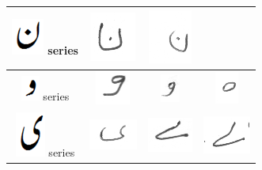 \begin{table}[h]
\begin{tabular}{@{}cccc@{}}
\hline
\includegraphics[scale=0.15]{noon_orig} series & \includegraphics[scale=0.15]{143} & \includegraphics[scale=0.15]{144} &  \\
\hline
\includegraphics[scale=0.15]{wao_orig} series & \includegraphics[scale=0.15]{145} & \includegraphics[scale=0.15]{146}  & 
\includegraphics[scale=0.15]{147} \\
\hline
\includegraphics[scale=0.15]{choti_ye_orig} series & \includegraphics[scale=0.15]{148} & \includegraphics[scale=0.15]{149} & 
\includegraphics[scale=0.15]{150} \\
\hline
 \end{tabular}
\end{table}


